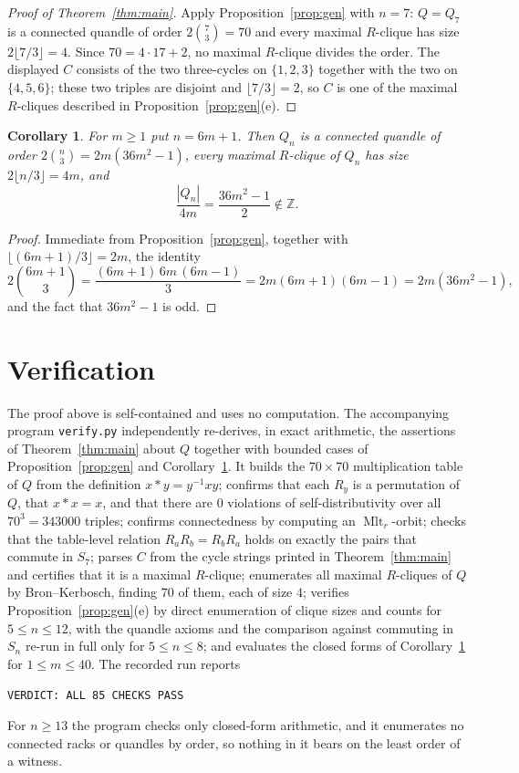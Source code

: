 \documentclass[11pt]{amsart}
\newtheorem{corollary}[theorem]{Corollary}
\theoremstyle{definition}
\theoremstyle{remark}
\DeclareMathOperator{\Mlt}{Mlt}
\newcommand{\Rt}{R}
\begin{document}
\begin{proof}[Proof of Theorem~\ref{thm:main}]
Apply Proposition~\ref{prop:gen} with $n=7$: $Q=Q_7$ is a connected quandle of
order $2\binom73=70$ and every maximal $R$-clique has size
$2\lfloor7/3\rfloor=4$. Since $70=4\cdot17+2$, no maximal $R$-clique divides
the order. The displayed $C$ consists of the two three-cycles on $\{1,2,3\}$
together with the two on $\{4,5,6\}$; these two triples are disjoint and
$\lfloor7/3\rfloor=2$, so $C$ is one of the maximal $R$-cliques described in
Proposition~\ref{prop:gen}(e).
\end{proof}

\begin{corollary}\label{cor:family}
For $m\ge1$ put $n=6m+1$. Then $Q_n$ is a connected quandle of order
$2\binom n3=2m(36m^2-1)$, every maximal $R$-clique of $Q_n$ has size
$2\lfloor n/3\rfloor=4m$, and
\[
  \frac{|Q_n|}{4m}=\frac{36m^2-1}{2}\notin\mathbb Z .
\]
\end{corollary}

\begin{proof}
Immediate from Proposition~\ref{prop:gen}, together with
$\lfloor(6m+1)/3\rfloor=2m$, the identity
\[
  2\binom{6m+1}3=\frac{(6m+1)\,6m\,(6m-1)}3=2m(6m+1)(6m-1)=2m(36m^2-1),
\]
and the fact that $36m^2-1$ is odd.
\end{proof}

\section{Verification}

The proof above is self-contained and uses no computation. The accompanying
program \texttt{verify.py} independently re-derives, in exact arithmetic, the
assertions of Theorem~\ref{thm:main} about $Q$ together with bounded cases of
Proposition~\ref{prop:gen} and Corollary~\ref{cor:family}. It builds the
$70\times70$ multiplication table of $Q$ from the definition $x*y=y^{-1}xy$;
confirms that each $\Rt_y$ is a permutation of $Q$, that $x*x=x$, and that
there are $0$ violations of self-distributivity over all $70^3=343000$ triples;
confirms connectedness by computing an $\Mlt_r$-orbit; checks that the
table-level relation $\Rt_a\Rt_b=\Rt_b\Rt_a$ holds on exactly the pairs that
commute in $S_7$; parses $C$ from the cycle strings printed in
Theorem~\ref{thm:main} and certifies that it is a maximal $R$-clique;
enumerates all maximal $R$-cliques of $Q$ by Bron--Kerbosch, finding $70$ of
them, each of size $4$; verifies Proposition~\ref{prop:gen}(e) by direct
enumeration of clique sizes and counts for $5\le n\le12$, with the quandle
axioms and the comparison against commuting in $S_n$ re-run in full only for
$5\le n\le8$; and evaluates the closed forms of Corollary~\ref{cor:family} for
$1\le m\le40$. The recorded run reports
\begin{center}
\texttt{VERDICT: ALL 85 CHECKS PASS}
\end{center}
For $n\ge13$ the program checks only closed-form arithmetic, and it enumerates
no connected racks or quandles by order, so nothing in it bears on the least
order of a witness.
\end{document}
